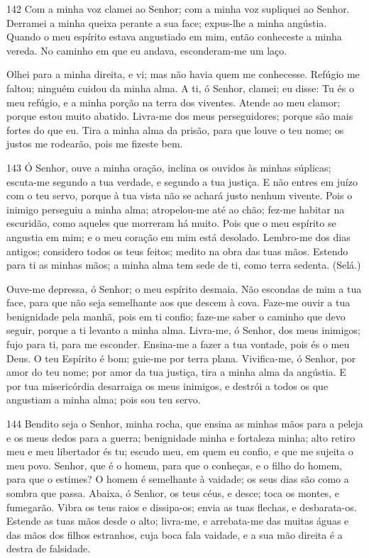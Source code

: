 \bigskip

\lettrine{142}{} Com a minha voz clamei ao Senhor; com a minha
voz supliquei ao Senhor. Derramei a minha queixa perante a sua
face; expus-lhe a minha angústia. Quando o meu espírito estava
angustiado em mim, então conheceste a minha vereda. No caminho em
que eu andava, esconderam-me um laço.

Olhei para a minha direita, e vi; mas não havia quem me
conhecesse. Refúgio me faltou; ninguém cuidou da minha alma. A
ti, ó Senhor, clamei; eu disse: Tu és o meu refúgio, e a minha
porção na terra dos viventes. Atende ao meu clamor; porque estou
muito abatido. Livra-me dos meus perseguidores; porque são mais
fortes do que eu. Tira a minha alma da prisão, para que louve o
teu nome; os justos me rodearão, pois me fizeste bem.

\bigskip

\lettrine{143}{} Ó Senhor, ouve a minha oração, inclina os
ouvidos às minhas súplicas; escuta-me segundo a tua verdade, e
segundo a tua justiça. E não entres em juízo com o teu servo,
porque à tua vista não se achará justo nenhum vivente. Pois o
inimigo perseguiu a minha alma; atropelou-me até ao chão; fez-me
habitar na escuridão, como aqueles que morreram há muito. Pois
que o meu espírito se angustia em mim; e o meu coração em mim está
desolado. Lembro-me dos dias antigos; considero todos os teus
feitos; medito na obra das tuas mãos. Estendo para ti as minhas
mãos; a minha alma tem sede de ti, como terra sedenta. (Selá.)

Ouve-me depressa, ó Senhor; o meu espírito desmaia. Não escondas
de mim a tua face, para que não seja semelhante aos que descem à
cova. Faze-me ouvir a tua benignidade pela manhã, pois em ti
confio; faze-me saber o caminho que devo seguir, porque a ti levanto
a minha alma. Livra-me, ó Senhor, dos meus inimigos; fujo para
ti, para me esconder. Ensina-me a fazer a tua vontade, pois
és o meu Deus. O teu Espírito é bom; guie-me por terra plana.
Vivifica-me, ó Senhor, por amor do teu nome; por amor da tua
justiça, tira a minha alma da angústia. E por tua
misericórdia desarraiga os meus inimigos, e destrói a todos os que
angustiam a minha alma; pois sou teu servo.

\bigskip

\lettrine{144}{} Bendito seja o Senhor, minha rocha, que ensina
as minhas mãos para a peleja e os meus dedos para a guerra;
benignidade minha e fortaleza minha; alto retiro meu e meu
libertador és tu; escudo meu, em quem eu confio, e que me sujeita o
meu povo. Senhor, que é o homem, para que o conheças, e o filho
do homem, para que o estimes? O homem é semelhante à vaidade; os
seus dias são como a sombra que passa. Abaixa, ó Senhor, os teus
céus, e desce; toca os montes, e fumegarão. Vibra os teus raios
e dissipa-os; envia as tuas flechas, e desbarata-os. Estende as
tuas mãos desde o alto; livra-me, e arrebata-me das muitas águas e
das mãos dos filhos estranhos, cuja boca fala vaidade, e a sua
mão direita é a destra de falsidade.

